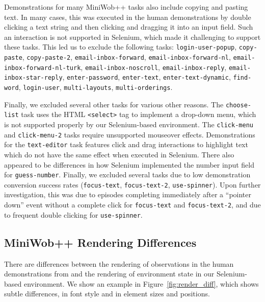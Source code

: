 Demonstrations for many MiniWob++ tasks also include copying and pasting text. In many cases, this was executed in the human demonstrations by double clicking a text string and then clicking and dragging it into an input field. Such an interaction is not supported in Selenium, which made it challenging to support these tasks. This led us to exclude the following tasks: 
\texttt{login-user-popup},
\texttt{copy-paste},
\texttt{copy-paste-2},
\texttt{email-inbox-forward},
\texttt{email-inbox-forward-nl},
\texttt{email-inbox-forward-nl-turk},
\texttt{email-inbox-noscroll},
\texttt{email-inbox-reply},
\texttt{email-inbox-star-reply},
\texttt{enter-password}, 
\texttt{enter-text}, 
\texttt{enter-text-dynamic}, 
\texttt{find-word}, 
\texttt{login-user}, 
\texttt{multi-layouts}, 
\texttt{multi-orderings}.

Finally, we excluded several other tasks for various other reasons. The \texttt{choose-list} task uses the HTML \texttt{<select>} tag to implement a drop-down menu, which is not supported properly by our Selenium-based environment. The \texttt{click-menu} and \texttt{click-menu-2} tasks require unsupported mouseover effects. Demonstrations for the \texttt{text-editor} task features click and drag interactions to highlight text which do not have the same effect when executed in Selenium. There also appeared to be differences in how Selenium implemented the number input field for \texttt{guess-number}. Finally, we excluded several tasks due to low demonstration conversion success rates (\texttt{focus-text}, \texttt{focus-text-2}, \texttt{use-spinner}). Upon further investigation, this was due to episodes completing immediately after a ``pointer down'' event without a complete click for \texttt{focus-text} and \texttt{focus-text-2}, and due to frequent double clicking for \texttt{use-spinner}. 
\subsection{MiniWob++ Rendering Differences}

There are differences between the rendering of observations in the human demonstrations from \citet{humphreys2022data} and the rendering of environment state in our Selenium-based environment. We show an example in Figure~\ref{fig:render_diff}, which shows subtle differences, \eg in font style and in element sizes and positions.

